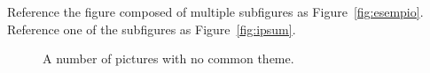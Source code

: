 \documentclass[
12pt, %
a4paper, %
oneside, %
headinclude,footinclude, %
BCOR5mm, %
german]{scrartcl}
\begin{document}
Reference the figure composed of multiple subfigures as Figure~\vref{fig:esempio}. Reference one of the subfigures as Figure~\vref{fig:ipsum}. %

\lipsum[15-18] %

\begin{figure}[tb]
\centering
\caption[A number of pictures.]{A number of pictures with no common theme.} %
\label{fig:esempio}
\end{figure}


\renewcommand{\refname}{\spacedlowsmallcaps{References}} %




\end{document}
